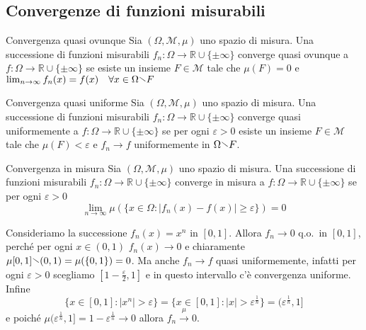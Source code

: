 \subsection{Convergenze di funzioni misurabili}
\begin{definition}{Convergenza quasi ovunque}
    Sia \((\Omega, \mathcal{M}, \mu)\) uno spazio di misura. Una successione di
    funzioni misurabili \(f_{n} : \Omega \to \mathbb{R} \cup \{\pm \infty\} \)
    converge quasi ovunque a \(f : \Omega \to \mathbb{R} \cup \{\pm \infty\} \)
    se esiste un insieme \(F \in \mathcal{M}\) tale che \(\mu(F) = 0\) e
    \(\lim_{n \to \infty} f_{n}(x) = f(x) \quad \forall x \in \Omega \sminus F\)
\end{definition}
\begin{definition}{Convergenza quasi uniforme}
    Sia \((\Omega, \mathcal{M}, \mu)\) uno spazio di misura. Una successione di
    funzioni misurabili \(f_{n} : \Omega \to \mathbb{R} \cup \{\pm \infty\} \)
    converge quasi uniformemente a \(f : \Omega \to \mathbb{R} \cup \{\pm \infty\} \)
    se per ogni \(\varepsilon > 0\) esiste un insieme \(F \in \mathcal{M}\) tale
    che \(\mu(F) < \varepsilon\) e \(f_{n} \to f\) uniformemente in \(\Omega
    \sminus F\).
\end{definition}
\begin{definition}{Convergenza in misura}
    Sia \((\Omega, \mathcal{M}, \mu)\) uno spazio di misura. Una successione di
    funzioni misurabili \(f_{n} : \Omega \to \mathbb{R} \cup \{\pm \infty\} \)
    converge in misura a \(f : \Omega \to \mathbb{R} \cup \{\pm \infty\} \) se
    per ogni \(\varepsilon > 0\) 
    \[
        \lim_{n \to \infty} \mu(\{x \in \Omega : |f_{n}(x) - f(x)| \ge
        \varepsilon\}) = 0
    \]
\end{definition}
\begin{example}
    Consideriamo la successione \(f_{n}{(x)} = x^{n}\) in \([0,1]\). Allora
    \(f_{n} \to 0\) q.o.~in \([0, 1]\), perché per ogni \(x \in (0, 1)\)
    \(f_{n}{(x)} \to 0\) e chiaramente \(\mu{[0,1] \sminus {(0,1)}} =
    \mu{(\{0,1\} )} = 0\). Ma anche \(f_{n} \to f\) quasi uniformemente, infatti
    per ogni \(\varepsilon > 0\) scegliamo \([1-\frac{\varepsilon}{2} , 1]\) e
    in questo intervallo c'è convergenza uniforme. Infine 
    \[
        \{x \in [0,1] : |x^{n}| > \varepsilon\} = \{x \in
        [0,1] : |x| > \varepsilon^{\frac{1}{n}}\} = (\varepsilon^{\frac{1}{n}},
        1]
    \]
    e poiché \(\mu{(\varepsilon^{\frac{1}{n}}, 1]} = 1-\varepsilon^{\frac{1}{n}}
    \to 0\) allora \(f_{n} \overset{\mu}{\to} 0\).
\end{example}
